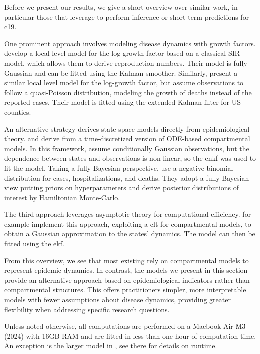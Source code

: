 Before we present our results, we give a short overview over similar work, in particular those that leverage  to perform inference or short-term predictions for \acrshort{c19}.

One prominent approach involves modeling disease dynamics with growth factors. \citep{Arroyo-Marioli2021Tracking} develop a local level model for the log-growth factor based on a classical SIR model, which allows them to derive reproduction numbers. Their model is fully Gaussian and can be fitted using the Kalman smoother. Similarly, \citep{Ives2021Estimating} present a similar local level model for the log-growth factor, but assume observations to follow a quasi-Poisson distribution, modeling the growth of deaths instead of the reported cases. Their model is fitted using the extended Kalman filter for US counties.

An alternative strategy derives state space models directly from epidemiological theory. \citep{Lal2021Application} and \citep{Keller2022Tracking} derive  from a time-discretized version of ODE-based compartmental models. In this framework, \citep{Lal2021Application} assume conditionally Gaussian observations, but the dependence between states and observations is non-linear, so the \acrshort{enkf} was used to fit the model. Taking a fully Bayesian perspective, \citep{Keller2022Tracking} use a negative binomial distribution for cases, hospitalizations, and deaths. They adopt a fully Bayesian view putting priors on hyperparameters and derive posterior distributions of interest by Hamiltonian Monte-Carlo.

The third approach leverages asymptotic theory for computational efficiency. \citep{ODea2022Semiparametric} for example implement this approach, exploiting a \acrshort{clt} for compartmental models, to obtain a Gaussian approximation to the states' dynamics. The model can then be fitted using the \acrshort{ekf}.

From this overview, we see that most existing  rely on compartmental models to represent epidemic dynamics. In contrast, the models we present in this section provide an alternative approach based on epidemiological indicators rather than compartmental structures. This offers practitioners simpler, more interpretable models with fewer assumptions about disease dynamics, providing greater flexibility when addressing specific research questions.

Unless noted otherwise, all computations are performed on a Macbook Air M3 (2024) with 16GB RAM and are fitted in less than one hour of computation time.  An exception is the larger model in , see there for details on runtime.



